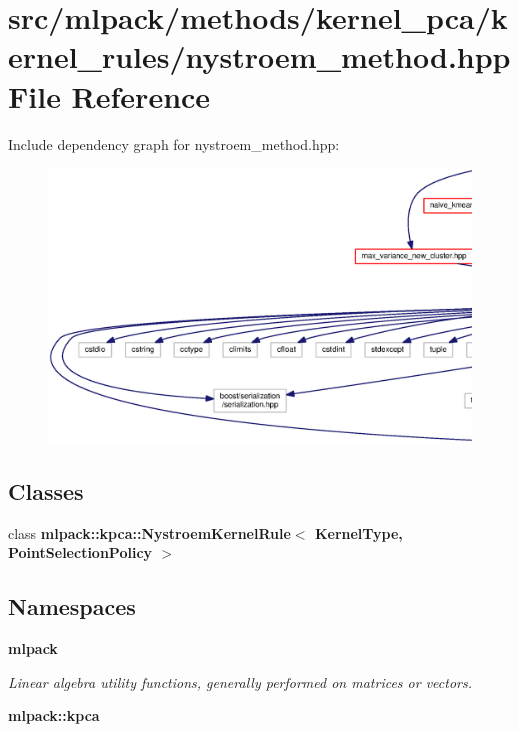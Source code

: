 \section{src/mlpack/methods/kernel\+\_\+pca/kernel\+\_\+rules/nystroem\+\_\+method.hpp File Reference}
\label{kernel__pca_2kernel__rules_2nystroem__method_8hpp}
Include dependency graph for nystroem\+\_\+method.\+hpp\+:
\nopagebreak
\begin{figure}[H]
\begin{center}
\leavevmode
\includegraphics[width=350pt]{kernel__pca_2kernel__rules_2nystroem__method_8hpp__incl}
\end{center}
\end{figure}
\subsection*{Classes}
\begin{DoxyCompactItemize}
\item 
class {\bf mlpack\+::kpca\+::\+Nystroem\+Kernel\+Rule$<$ Kernel\+Type, Point\+Selection\+Policy $>$}
\end{DoxyCompactItemize}
\subsection*{Namespaces}
\begin{DoxyCompactItemize}
\item 
 {\bf mlpack}
\begin{DoxyCompactList}\small\item\em Linear algebra utility functions, generally performed on matrices or vectors. \end{DoxyCompactList}\item 
 {\bf mlpack\+::kpca}
\end{DoxyCompactItemize}
